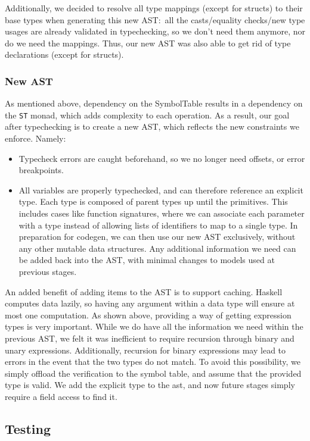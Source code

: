 \documentclass[11pt]{article}
\begin{document}
Additionally, we decided to resolve all type mappings (except for
structs) to their base types when generating this new AST:~all the
casts/equality checks/new type usages are already validated in
typechecking, so we don't need them anymore, nor do we need the
mappings. Thus, our new AST was also able to get rid of type
declarations (except for structs).
\subsubsection{New AST}
As mentioned above, dependency on the SymbolTable results in a
dependency on the \texttt{ST} monad, which adds complexity to each
operation.  As a result, our goal after typechecking is to create a
new AST, which reflects the new constraints we enforce.  Namely:
\begin{itemize}
\item Typecheck errors are caught beforehand, so we no longer need
  offsets, or error breakpoints.
\item All variables are properly typechecked, and can therefore
  reference an explicit type. Each type is composed of parent types up
  until the primitives.  This includes cases like function signatures,
  where we can associate each parameter with a type instead of
  allowing lists of identifiers to map to a single type.  In
  preparation for codegen, we can then use our new AST exclusively,
  without any other mutable data structures. Any additional
  information we need can be added back into the AST, with minimal
  changes to models used at previous stages.
\end{itemize}

An added benefit of adding items to the AST is to support caching.
Haskell computes data lazily, so having any argument within a
data type will ensure at most one computation.
As shown above, providing a way of getting expression types is very important. While we do have all the information we need within the previous AST,
we felt it was inefficient to require recursion through binary and unary expressions.
Additionally, recursion for binary expressions may lead to errors in the
event that the two types do not match. To avoid this possibility,
we simply offload the verification to the symbol table, and assume that the provided type is valid.
We add the explicit type to the ast, and now future stages simply require
a field access to find it.

\subsection{Testing} %
\end{document}
